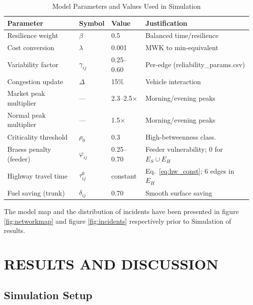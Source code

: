 \documentclass[paper=A4, 12pt, mathscr]{report}
\begin{document}
	\begin{table}[H]
		\centering
		\caption{Model Parameters and Values Used in Simulation}
		\label{tab:params}
		\begin{tabular}{llll}
			\hline
			\textbf{Parameter} & \textbf{Symbol} & \textbf{Value}
			& \textbf{Justification} \\
			\hline
			Resilience weight       & $\beta$          & 0.5
			& Balanced time/resilience \cite{6,11} \\
			Cost conversion         & $\lambda$        & 0.001
			& MWK to min-equivalent \cite{tirkolaee2020} \\
			Variability factor      & $\gamma_{ij}$    & 0.25--0.60
			& Per-edge (reliability\_params.csv) \\
			Congestion update       & $\Delta$         & 15\%
			& Vehicle interaction \cite{luan2024} \\
			Market peak multiplier  & ---              & 2.3--2.5$\times$
			& Morning/evening peaks \cite{8,9} \\
			Normal peak multiplier  & ---              & 1.5$\times$
			& Morning/evening peaks \cite{13} \\
			Criticality threshold   & $\rho_0$         & 0.3
			& High-betweenness class. \cite{11} \\
			Braess penalty (feeder) & $\varphi_{ij}$   & 0.25--0.70
			& Feeder vulnerability; 0 for $E_S\cup E_H$ \\
			Highway travel time     & $\tau_{ij}^0$    & constant
			& Eq.~\eqref{eq:hw_const}; 6 edges in $E_H$ \\
			Fuel saving (trunk)     & $\delta_{ij}$    & 0.70
			& Smooth surface saving \\
			\hline
		\end{tabular}
	\end{table}
	The model map and the distribution of incidents have been presented in figure \ref{fig:networkmap} and figure \ref{fig:incidents} respectively prior to Simulation of results.

	
	\chapter{RESULTS AND DISCUSSION}
	\label{ch:results}
	
	\section{Simulation Setup}
	
\end{document}
